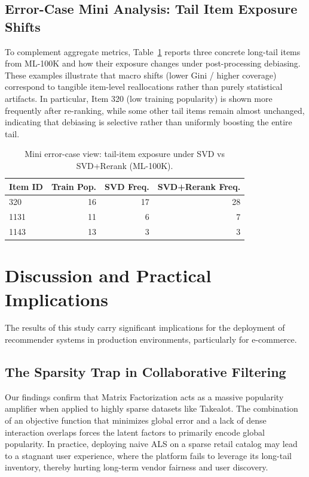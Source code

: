 \documentclass[conference]{IEEEtran}
\begin{document}
\subsection{Error-Case Mini Analysis: Tail Item Exposure Shifts}

To complement aggregate metrics, Table~\ref{tab:error_cases_tail} reports three concrete long-tail items from ML-100K and how their exposure changes under post-processing debiasing. These examples illustrate that macro shifts (lower Gini / higher coverage) correspond to tangible item-level reallocations rather than purely statistical artifacts. In particular, Item 320 (low training popularity) is shown more frequently after re-ranking, while some other tail items remain almost unchanged, indicating that debiasing is selective rather than uniformly boosting the entire tail.

\begin{table}[!t]
  \centering
  \caption{Mini error-case view: tail-item exposure under SVD vs SVD+Rerank (ML-100K).}
  \label{tab:error_cases_tail}
  \begin{tabular}{@{}lrrr@{}}
    \toprule
    \textbf{Item ID} & \textbf{Train Pop.} & \textbf{SVD Freq.} & \textbf{SVD+Rerank Freq.} \\
    \midrule
    320 & 16 & 17 & 28 \\
    1131 & 11 & 6 & 7 \\
    1143 & 13 & 3 & 3 \\
    \bottomrule
  \end{tabular}
\end{table}

\section{Discussion and Practical Implications}
\label{sec:discussion}

The results of this study carry significant implications for the deployment of recommender systems in production environments, particularly for e-commerce.

\subsection{The Sparsity Trap in Collaborative Filtering}
Our findings confirm that Matrix Factorization acts as a massive popularity amplifier when applied to highly sparse datasets like Takealot. The combination of an objective function that minimizes global error and a lack of dense interaction overlaps forces the latent factors to primarily encode global popularity. In practice, deploying naive ALS on a sparse retail catalog may lead to a stagnant user experience, where the platform fails to leverage its long-tail inventory, thereby hurting long-term vendor fairness and user discovery.
\end{document}
